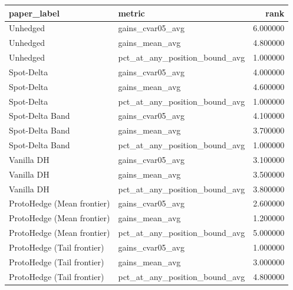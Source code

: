 \begin{tabular}{llr}
\toprule
paper_label & metric & rank \\
\midrule
Unhedged & gains_cvar05_avg & 6.000000 \\
Unhedged & gains_mean_avg & 4.800000 \\
Unhedged & pct_at_any_position_bound_avg & 1.000000 \\
Spot-Delta & gains_cvar05_avg & 4.000000 \\
Spot-Delta & gains_mean_avg & 4.600000 \\
Spot-Delta & pct_at_any_position_bound_avg & 1.000000 \\
Spot-Delta Band & gains_cvar05_avg & 4.100000 \\
Spot-Delta Band & gains_mean_avg & 3.700000 \\
Spot-Delta Band & pct_at_any_position_bound_avg & 1.000000 \\
Vanilla DH & gains_cvar05_avg & 3.100000 \\
Vanilla DH & gains_mean_avg & 3.500000 \\
Vanilla DH & pct_at_any_position_bound_avg & 3.800000 \\
ProtoHedge (Mean frontier) & gains_cvar05_avg & 2.600000 \\
ProtoHedge (Mean frontier) & gains_mean_avg & 1.200000 \\
ProtoHedge (Mean frontier) & pct_at_any_position_bound_avg & 5.000000 \\
ProtoHedge (Tail frontier) & gains_cvar05_avg & 1.000000 \\
ProtoHedge (Tail frontier) & gains_mean_avg & 3.000000 \\
ProtoHedge (Tail frontier) & pct_at_any_position_bound_avg & 4.800000 \\
\bottomrule
\end{tabular}
